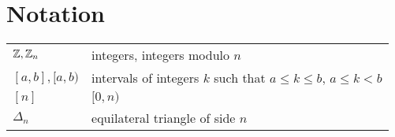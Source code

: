 \chapter*{Notation}

\bigskip

\noindent
 \begin{tabularx}{\linewidth}{l X}
 $\mathbb Z, \mathbb Z_n$ & integers, integers modulo $n$ \\
 $[a,b], [a,b)$ & intervals of integers $k$ such that $a \leq k \leq b$, $a \leq k < b$ \\
 $[n]$ & $[0,n)$ \\
 $\Delta_n$ & equilateral triangle of side $n$ \\
 \end{tabularx}